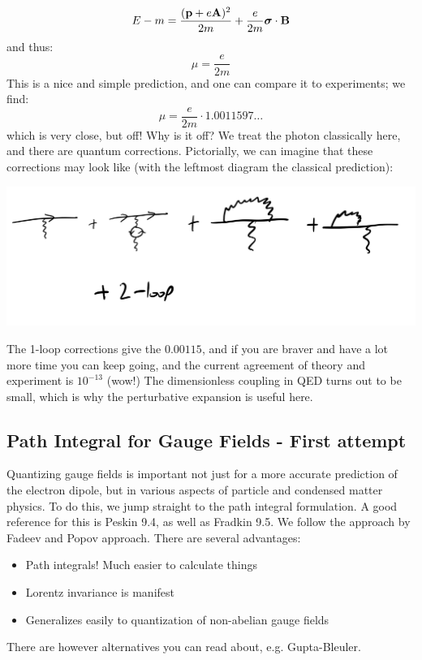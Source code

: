 \begin{equation}
    E - m = \frac{(\mathbf{p} + e\mathbf{A})^2}{2m} + \frac{e}{2m}\mbox{\boldmath$ \sigma $} \cdot \mathbf{B}
\end{equation}
and thus:
\begin{equation}
    \boxed{\mu = \frac{e}{2m}}
\end{equation}
This is a nice and simple prediction, and one can compare it to experiments; we find:
\begin{equation}
    \mu = \frac{e}{2m}\cdot 1.0011597\ldots
\end{equation}
which is very close, but off! Why is it off? We treat the photon classically here, and there are quantum corrections. Pictorially, we can imagine that these corrections may look like (with the leftmost diagram the classical prediction):

\begin{center}
    \includegraphics[scale=0.35]{Lectures/Images/lec8-mufeynmans.png}
\end{center}

The 1-loop corrections give the $0.00115$, and if you are braver and have a lot more time you can keep going, and the current agreement of theory and experiment is $10^{-13}$ (wow!) The dimensionless coupling in QED turns out to be small, which is why the perturbative expansion is useful here.

\subsection{Path Integral for Gauge Fields - First attempt}
Quantizing gauge fields is important not just for a more accurate prediction of the electron dipole, but in various aspects of particle and condensed matter physics. To do this, we jump straight to the path integral formulation. A good reference for this is Peskin 9.4, as well as Fradkin 9.5. We follow the approach by Fadeev and Popov approach. There are several advantages:
\begin{itemize}
    \item Path integrals! Much easier to calculate things
    \item Lorentz invariance is manifest
    \item Generalizes easily to quantization of non-abelian gauge fields
\end{itemize}
There are however alternatives you can read about, e.g. Gupta-Bleuler.


